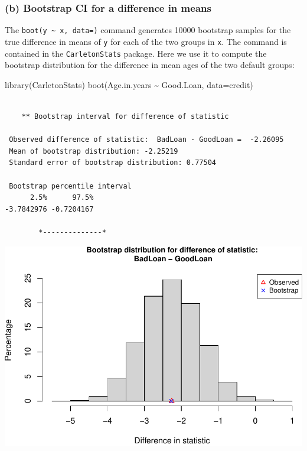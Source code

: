 \documentclass[
]{book}
\newenvironment{Shaded}{\begin{snugshade}}{\end{snugshade}}
\newcommand{\AttributeTok}[1]{\textcolor[rgb]{0.77,0.63,0.00}{#1}}
\newcommand{\FunctionTok}[1]{\textcolor[rgb]{0.00,0.00,0.00}{#1}}
\newcommand{\NormalTok}[1]{#1}
\newcommand{\SpecialCharTok}[1]{\textcolor[rgb]{0.00,0.00,0.00}{#1}}
\begin{document}
\hypertarget{b-bootstrap-ci-for-a-difference-in-means}{%
\subsubsection{(b) Bootstrap CI for a difference in means}\label{b-bootstrap-ci-for-a-difference-in-means}}

The \texttt{boot(y\ \textasciitilde{}\ x,\ data=)} command generates 10000 bootstrap samples for the true difference in means of \texttt{y} for each of the two groups in \texttt{x}. The command is contained in the \texttt{CarletonStats} package. Here we use it to compute the bootstrap distribution for the difference in mean ages of the two default groups:

\begin{Shaded}
\begin{Highlighting}[]
\FunctionTok{library}\NormalTok{(CarletonStats)}
\FunctionTok{boot}\NormalTok{(Age.in.years }\SpecialCharTok{\textasciitilde{}}\NormalTok{ Good.Loan, }\AttributeTok{data=}\NormalTok{credit)}
\end{Highlighting}
\end{Shaded}

\begin{verbatim}

    ** Bootstrap interval for difference of statistic

 Observed difference of statistic:  BadLoan - GoodLoan =  -2.26095 
 Mean of bootstrap distribution: -2.25219 
 Standard error of bootstrap distribution: 0.77504 

 Bootstrap percentile interval
      2.5%      97.5% 
-3.7842976 -0.7204167 

        *--------------*
\end{verbatim}

\includegraphics[width=1\linewidth]{Class_Activity_8_files/figure-latex/unnamed-chunk-5-1}
\end{document}
